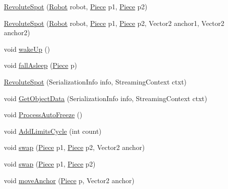 \begin{DoxyCompactItemize}
\item 
\hyperlink{classgearit_1_1src_1_1robot_1_1_revolute_spot_a3b00292e90252e654d88f4c48a48d0db}{Revolute\+Spot} (\hyperlink{classgearit_1_1src_1_1robot_1_1_robot}{Robot} robot, \hyperlink{classgearit_1_1src_1_1robot_1_1_piece}{Piece} p1, \hyperlink{classgearit_1_1src_1_1robot_1_1_piece}{Piece} p2)
\item 
\hyperlink{classgearit_1_1src_1_1robot_1_1_revolute_spot_ad6f408eb0645c572153976cf41a3e3cd}{Revolute\+Spot} (\hyperlink{classgearit_1_1src_1_1robot_1_1_robot}{Robot} robot, \hyperlink{classgearit_1_1src_1_1robot_1_1_piece}{Piece} p1, \hyperlink{classgearit_1_1src_1_1robot_1_1_piece}{Piece} p2, Vector2 anchor1, Vector2 anchor2)
\item 
void \hyperlink{classgearit_1_1src_1_1robot_1_1_revolute_spot_aa00f26cdc2c08b02d02da8588acaa1d9}{wake\+Up} ()
\item 
void \hyperlink{classgearit_1_1src_1_1robot_1_1_revolute_spot_a2a716df041db37d7016664ea3e4a1f16}{fall\+Asleep} (\hyperlink{classgearit_1_1src_1_1robot_1_1_piece}{Piece} p)
\item 
\hyperlink{classgearit_1_1src_1_1robot_1_1_revolute_spot_ac18550d29a93461096ae3811f2066781}{Revolute\+Spot} (Serialization\+Info info, Streaming\+Context ctxt)
\item 
void \hyperlink{classgearit_1_1src_1_1robot_1_1_revolute_spot_a59d7ec7a712a68c6945648795c5d5737}{Get\+Object\+Data} (Serialization\+Info info, Streaming\+Context ctxt)
\item 
void \hyperlink{classgearit_1_1src_1_1robot_1_1_revolute_spot_a508949c08beab8139d4b5a1b8d3010b0}{Process\+Auto\+Freeze} ()
\item 
void \hyperlink{classgearit_1_1src_1_1robot_1_1_revolute_spot_abbe5811a4889462e5ec677d3390e084e}{Add\+Limits\+Cycle} (int count)
\item 
void \hyperlink{classgearit_1_1src_1_1robot_1_1_revolute_spot_aa7c15741d3043c37410aeb72d69c471c}{swap} (\hyperlink{classgearit_1_1src_1_1robot_1_1_piece}{Piece} p1, \hyperlink{classgearit_1_1src_1_1robot_1_1_piece}{Piece} p2, Vector2 anchor)
\item 
void \hyperlink{classgearit_1_1src_1_1robot_1_1_revolute_spot_afb281c903af0446d1b81b433f6e0e419}{swap} (\hyperlink{classgearit_1_1src_1_1robot_1_1_piece}{Piece} p1, \hyperlink{classgearit_1_1src_1_1robot_1_1_piece}{Piece} p2)
\item 
void \hyperlink{classgearit_1_1src_1_1robot_1_1_revolute_spot_af6605ea66d768d15928a40436a6e4465}{move\+Anchor} (\hyperlink{classgearit_1_1src_1_1robot_1_1_piece}{Piece} p, Vector2 anchor)

\end{DoxyCompactItemize}
